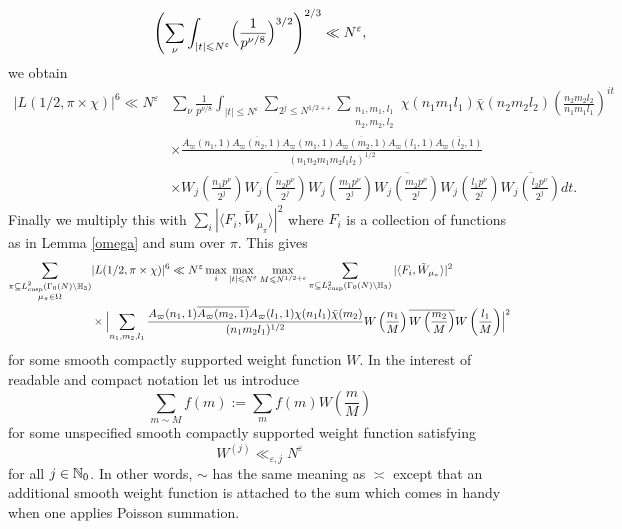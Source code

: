 \documentclass[11pt]{amsart}
\theoremstyle{plain}
\numberwithin{equation}{section}
\theoremstyle{definition}
\renewcommand{\leq}{\leqslant}
\begin{document}
$$\Biggl(\sum_{\nu}  \int_{|t| \leq N^{\varepsilon}} \Bigl(\frac{1}{p^{\nu/8}}\Bigr)^{3/2}\Biggr)^{2/3}   \ll N^{\varepsilon},$$
we obtain
\begin{displaymath}
\begin{split}
  |L(1/2, \pi \times \chi)|^6 \ll N^{\varepsilon} & \sum_{\nu} \frac{1}{p^{\nu/8}}  \int_{|t| \leq N^{\varepsilon} } \sum_{2^j \leq N^{1/2+\varepsilon}}   \sum_{\substack{n_1, m_1, l_1\\ n_2, m_2, l_2}} \chi(n_1m_1l_1)\bar{\chi}(n_2m_2l_2)\left(\frac{n_2m_2l_2}{n_1m_1l_1}\right)^{it}\\
& 
\times \frac{A_{\varpi}(n_1, 1) \overline{A_{\varpi}(n_2, 1)}A_{\varpi}(m_1, 1) \overline{A_{\varpi}(m_2, 1)} A_{\varpi}(l_1, 1) \overline{A_{\varpi}(l_2, 1)}}{(n_1n_2m_1m_2l_1l_2)^{1/2}}  \\
&\times W_j\left(\frac{n_1p^{\nu}}{2^j}\right)\overline{W_j\left(\frac{n_2p^{\nu}}{2^j}\right)} W_j\left(\frac{m_1p^{\nu}}{2^j}\right)\overline{W_j\left(\frac{m_2p^{\nu}}{2^j}\right)} W_j\left(\frac{l_1p^{\nu}}{2^j}\right)\overline{W_j\left(\frac{l_2p^{\nu}}{2^j}\right)}   dt. 
\end{split}
\end{displaymath}
Finally we multiply this with $\sum_{i}| \langle F_i, \tilde{W}_{\mu_{\pi}}\rangle|^2$ where $F_i$ is a collection of functions as in Lemma \ref{omega} and sum over $\pi$. This gives 
\begin{displaymath}
\begin{split}
\sum_{\substack{\pi \subseteq L^2_{\rm cusp}(\Gamma_0(N)\backslash \Bbb{H}_3)\\ \mu_{\pi} \in \Omega}} & |L(1/2, \pi \times \chi)|^6 \ll N^{\varepsilon}  \max_i \max_{|t| \leq N^{\varepsilon} } \max_{M \leq N^{1/2+\varepsilon}} \sum_{ \pi \subseteq L^2_{\rm cusp}(\Gamma_0(N)\backslash \Bbb{H}_3)} | \langle F_i, \tilde{W}_{\mu_{\pi}}\rangle|^2  \\
&\times \Bigl|\sum_{n_1, m_2, l_1} \frac{A_{\varpi}(n_1, 1) \overline{A_{\varpi}(m_2, 1)} A_{\varpi}(l_1, 1) \chi(n_1l_1)\bar{\chi}(m_2)}{(n_1m_2l_1)^{1/2}}   W\left(\frac{n_1}{M}\right) \overline{W\left(\frac{m_2}{M}\right)} W\left(\frac{l_1}{M}\right)\Bigr|^2  
\end{split}
\end{displaymath}
for some smooth compactly supported weight function $W$. 
 In the interest of readable and compact notation  let us introduce  
$$\sum_{m \sim M} f(m) := \sum_{m} f(m) W\left(\frac{m}{M}\right)$$
for some unspecified smooth compactly supported weight function satisfying
$$W^{(j)} \ll_{\varepsilon, j} N^{\varepsilon}$$
for all $j \in \Bbb{N}_0$.   
In other words, $\sim$ has the same meaning as $\asymp$ except that an additional smooth weight function is attached to the sum which comes in handy when one applies Poisson summation. 
\end{document}
